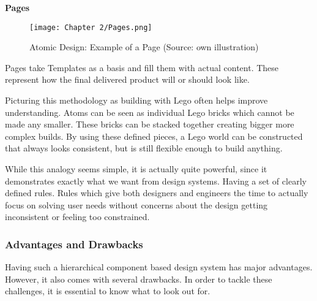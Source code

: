 \textbf{Pages}\\
\begin{figure}[H]
	\centering
    \texttt{[image: Chapter 2/Pages.png]}
    \caption{Atomic Design: Example of a Page (Source: own illustration)}
\end{figure}
Pages take Templates as a basis and fill them with actual content. These represent how the final
delivered product will or should look like. 

Picturing this methodology as building with Lego often helps improve understanding. Atoms can be
seen as individual Lego bricks which cannot be made any smaller. These bricks can be stacked
together creating bigger more complex builds. By using these defined pieces, a Lego world can be
constructed that always looks consistent, but is still flexible enough to build anything.

While this analogy seems simple, it is actually quite powerful, since it demonstrates exactly what
we want from design systems. Having a set of clearly defined rules. Rules which give both designers
and engineers the time to actually focus on solving user needs without concerns about the design
getting inconsistent or feeling too constrained. 

\subsubsection{Advantages and Drawbacks}
Having such a hierarchical component based design system has major advantages. However, it also
comes with several drawbacks. In order to tackle these challenges, it is essential to know what to
look out for.

